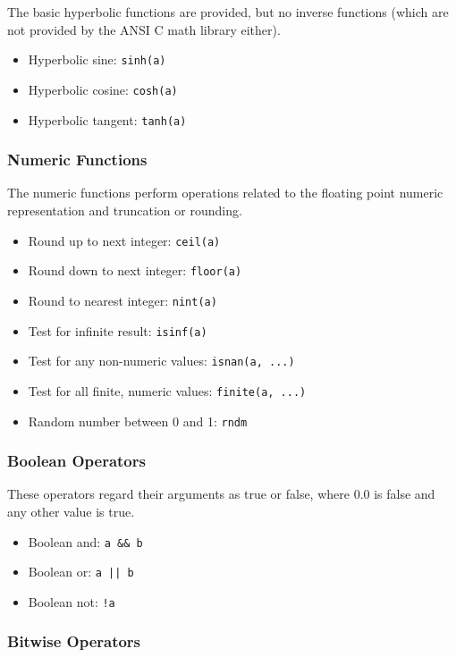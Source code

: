The basic hyperbolic functions are provided, but no inverse functions (which are not provided by the ANSI C math library 
either).

\begin{itemize}\item Hyperbolic sine: \verb|sinh(a)|

\item Hyperbolic cosine: \verb|cosh(a)|

\item Hyperbolic tangent: \verb|tanh(a)|

\end{itemize}\subsubsection{Numeric Functions}

The numeric functions perform operations related to the floating point numeric representation and truncation or rounding.

\begin{itemize}\item Round up to next integer: \verb|ceil(a)|

\item Round down to next integer: \verb|floor(a)|

\item Round to nearest integer: \verb|nint(a)|

\item Test for infinite result: \verb|isinf(a)|

\item Test for any non-numeric values: \verb|isnan(a, ...)|

\item Test for all finite, numeric values: \verb|finite(a, ...)|

\item Random number between 0 and 1: \verb|rndm|

\end{itemize}\subsubsection{Boolean Operators}

These operators regard their arguments as true or false, where 0.0 is false and any other value is true.

\begin{itemize}\item Boolean and: \verb|a && b|

\item Boolean or: \verb|a |\verb+|+\verb||\verb+|+\verb| b|

\item Boolean not: \verb|!a|

\end{itemize}\subsubsection{Bitwise Operators}

